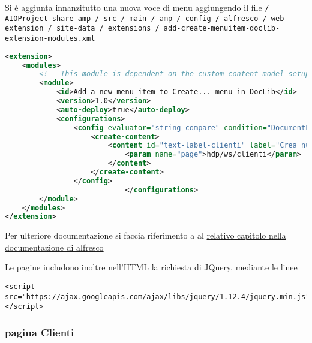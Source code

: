 Si è aggiunta innanzitutto una nuova voce di menu aggiungendo il file \texttt{/ AIOProject-share-amp / src / main / amp / config / alfresco / web-extension / site-data / extensions / add-create-menuitem-doclib-extension-modules.xml}
\begin{lstlisting}[language=XML]
<extension>
    <modules>
        <!-- This module is dependent on the custom content model setup in the repo-amp module -->
        <module>
            <id>Add a new menu item to Create... menu in DocLib</id>
            <version>1.0</version>
            <auto-deploy>true</auto-deploy>
            <configurations>
                <config evaluator="string-compare" condition="DocumentLibrary">
                    <create-content>
                        <content id="text-label-clienti" label="Crea nuovo cliente" icon="text" type="pagelink">
                            <param name="page">hdp/ws/clienti</param>
                        </content>
                    </create-content>
                </config>
                            </configurations>
        </module>
    </modules>
</extension>
\end{lstlisting}

Per ulteriore documentazione si faccia riferimento a al \href{http://docs.alfresco.com/5.0/tasks/dev-extensions-share-tutorials-add-menuitem-create-menu.html}{relativo capitolo nella documentazione di alfresco}

Le pagine includono inoltre nell’HTML la richiesta di JQuery, mediante le linee
\begin{lstlisting}
<script src="https://ajax.googleapis.com/ajax/libs/jquery/1.12.4/jquery.min.js"></script>
\end{lstlisting}

\subsubsection{pagina Clienti}

